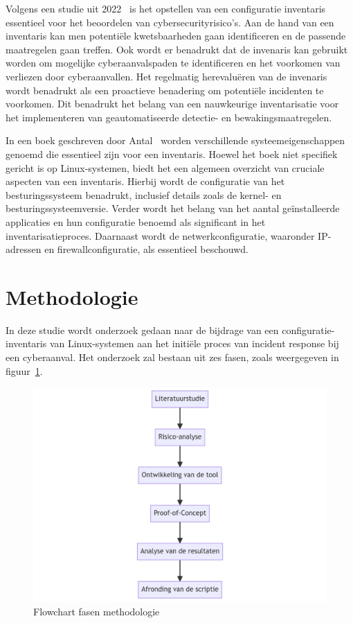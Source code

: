Volgens een studie uit 2022~\autocite{Kotenko2022} is het opstellen van een configuratie inventaris essentieel voor het beoordelen van cybersecurityrisico's.
Aan de hand van een inventaris kan men potenti\"ele kwetsbaarheden gaan identificeren en de passende maatregelen gaan treffen.
Ook wordt er benadrukt dat de invenaris kan gebruikt worden om mogelijke cyberaanvalspaden te identificeren en het voorkomen van verliezen door cyberaanvallen.
Het regelmatig herevalu\"eren van de invenaris wordt benadrukt als een proactieve benadering om potenti\"ele incidenten te voorkomen.
Dit benadrukt het belang van een nauwkeurige inventarisatie voor het implementeren van geautomatiseerde detectie- en bewakingsmaatregelen.

In een boek geschreven door Antal~\autocite{Antal2010} worden verschillende systeemeigenschappen genoemd die essentieel zijn voor een inventaris.
Hoewel het boek niet specifiek gericht is op Linux-systemen, biedt het een algemeen overzicht van cruciale aspecten van een inventaris.
Hierbij wordt de configuratie van het besturingssysteem benadrukt, inclusief details zoals de kernel- en besturingssysteemversie.
Verder wordt het belang van het aantal geïnstalleerde applicaties en hun configuratie benoemd als significant in het inventarisatieproces.
Daarnaast wordt de netwerkconfiguratie, waaronder IP-adressen en firewallconfiguratie, als essentieel beschouwd.

\section{Methodologie}%
\label{sec:methodologie}

In deze studie wordt onderzoek gedaan naar de bijdrage van een configuratie-inventaris van Linux-systemen aan het initi\"ele proces van incident response bij een cyberaanval.
Het onderzoek zal bestaan uit zes fasen, zoals weergegeven in figuur~\ref{fig:flowchart}.

\begin{figure}[h!]
    \includegraphics[width=.49\textwidth]
    {graphics/methodologie_flowchart.png}
    \caption{\label{fig:flowchart}Flowchart fasen methodologie}
\end{figure}


